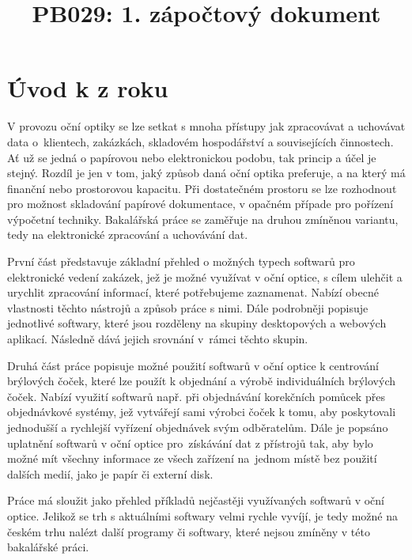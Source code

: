 \documentclass[12pt]{article}
\title{PB029: 1. zápočtový dokument}
\begin{document}


\section*{Úvod k  z roku \citeyear{Zouvala2020thesis}\cite{Zouvala2020thesis}} 
V provozu oční optiky se lze setkat s mnoha přístupy jak zpracovávat a uchovávat data o~klientech, zakázkách, skladovém hospodářství a souvisejících činnostech. Ať už se jedná o papírovou nebo elektronickou podobu, tak princip a účel je stejný. Rozdíl je jen v tom, jaký způsob daná oční optika preferuje, a na který má finanční nebo prostorovou kapacitu. Při dostatečném prostoru se lze rozhodnout pro možnost skladování papírové dokumentace, v opačném případe pro pořízení výpočetní techniky. Bakalářská práce se zaměřuje na druhou zmíněnou variantu, tedy na elektronické zpracování a uchovávání dat.

První část představuje základní přehled o možných typech softwarů pro elektronické vedení zakázek, jež je možné využívat v oční optice, s cílem ulehčit a urychlit zpracování informací, které potřebujeme zaznamenat. Nabízí obecné vlastnosti těchto nástrojů a způsob práce s nimi. Dále podrobněji popisuje jednotlivé softwary, které jsou rozděleny na skupiny desktopových a webových aplikací. Následně dává jejich srovnání v~rámci těchto skupin.

Druhá část práce popisuje možné použití softwarů v oční optice k centrování brýlových čoček, které lze použít k objednání a výrobě individuálních brýlových čoček. Nabízí využití softwarů např. při objednávání korekčních pomůcek přes objednávkové systémy, jež vytvářejí sami výrobci čoček k tomu, aby poskytovali jednodušší a rychlejší vyřízení objednávek svým odběratelům. Dále je popsáno uplatnění softwarů v oční optice pro~získávání dat z přístrojů tak, aby bylo možné mít všechny informace ze všech zařízení na~jednom místě bez použití dalších medií, jako je papír či externí disk.

Práce má sloužit jako přehled příkladů nejčastěji využívaných softwarů v oční optice. Jelikož se trh s aktuálními softwary velmi rychle vyvíjí, je tedy možné na českém trhu nalézt další programy či softwary, které nejsou zmíněny v této bakalářské práci.
\end{document}
